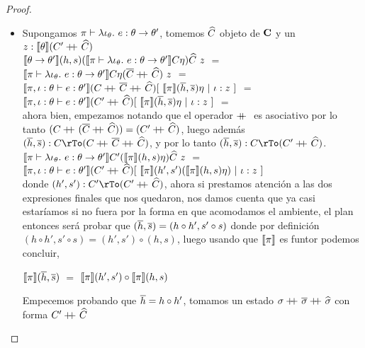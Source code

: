 \begin{proof}
\begin{itemize}
\begin{itemize}
\item Supongamos $\pi \vdash \lambda \iota_{\theta} . \ e : \theta \rightarrow \theta'$, tomemos
$\widehat{C}$ objeto de $\textbf{C}$ y un $z : \llbracket \theta \rrbracket(C'+\kern-1.3ex+\kern0.8ex\widehat{C})$ \\

$\llbracket \theta \rightarrow \theta' \rrbracket(h,s)
(\llbracket \pi \vdash 
	\lambda \iota_{\theta} . \ e : \theta \rightarrow \theta' \rrbracket C \eta)\widehat{C} \ z$ $=$\\
$\llbracket \pi \vdash \lambda \iota_{\theta} . \ e : \theta \rightarrow \theta' \rrbracket C 
	\eta (\overline{C} +\kern-1.3ex+\kern0.8ex \widehat{C}) \ z$ $=$\\
$\llbracket \pi,\iota:\theta \vdash e : \theta' \rrbracket
	(C +\kern-1.3ex+\kern0.8ex \overline{C} +\kern-1.3ex+\kern0.8ex \widehat{C})
	[ \ \llbracket \pi \rrbracket(\overline{h},\overline{s})\eta \ | \ \iota:z \ ]$ $=$\\
$\llbracket \pi,\iota:\theta \vdash e : \theta' \rrbracket
	(C' +\kern-1.3ex+\kern0.8ex \widehat{C})
	[ \ \llbracket \pi \rrbracket(\overline{h},\overline{s})\eta \ | \ \iota:z \ ]$ $=$\\

ahora bien, empezamos notando que el operador $+\kern-1.3ex+\kern0.8ex$ es asociativo por lo tanto
$(C +\kern-1.3ex+\kern0.8ex (\overline{C} +\kern-1.3ex+\kern0.8ex \widehat{C})) = (C' +\kern-1.3ex+\kern0.8ex \widehat{C})$, luego adem\'as
$(\hover,\sover) : C \rTo (C \concat \Cover \concat \Chat)$, y por lo tanto
$(\hover,\sover) : C \rTo (C' \concat \Chat)$.\\

$\llbracket \pi \vdash \lambda \iota_{\theta} . \ e : \theta \rightarrow \theta' \rrbracket
		C'(\llbracket \pi \rrbracket(h,s)\eta)\widehat{C} \ z$ $=$\\
$\semBrcks{\pi,\iota:\theta \vdash e : \theta'}(C' \concat \Chat)
			[ \ \semBrcks{\pi}(h',s')(\semBrcks{\pi}(h,s)\eta) \ | \ \iota:z \ ]$\\

donde $(h',s') : C' \rTo (C' \concat \Chat)$,
ahora si prestamos atenci\'on a las dos expresiones finales que nos quedaron, nos 
damos cuenta que ya casi estar\'iamos si no fuera por la forma en que acomodamos
el ambiente, el plan entonces ser\'a probar que $(\overline{h},\overline{s}) = (h \circ h',s'\circ s)$
donde por definici\'on $(h \circ h',s'\circ s) = (h',s') \circ (h,s)$, luego usando
que $\llbracket \pi \rrbracket$ es funtor podemos concluir,

\begin{center}
$\llbracket \pi \rrbracket(\overline{h},\overline{s})$ $=$ $\llbracket \pi \rrbracket(h',s') \circ \llbracket \pi \rrbracket(h,s)$
\end{center}

Empecemos probando que $\overline{h} = h \circ h'$, tomamos un estado 
$\sigma +\kern-1.3ex+\kern0.8ex \overline{\sigma} +\kern-1.3ex+\kern0.8ex \widehat{\sigma}$ con forma $C' +\kern-1.3ex+\kern0.8ex \widehat{C}$\\


\end{itemize}
\end{itemize}
\end{proof}
